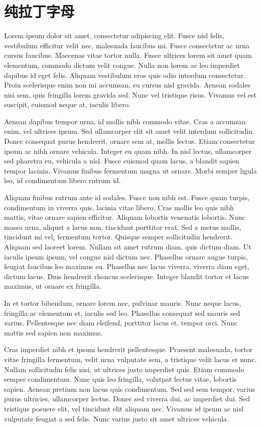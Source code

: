 \documentclass[10pt,openany]{book}
\begin{document}
\storyend

\chapter{纯拉丁字母}

Lorem ipsum dolor sit amet, consectetur adipiscing elit. Fusce nisl felis, vestibulum efficitur velit nec, malesuada faucibus mi. Fusce consectetur ac urna cursus faucibus. Maecenas vitae tortor nulla. Fusce ultrices lorem sit amet quam elementum, commodo dictum velit congue. Nulla non lorem ac leo imperdiet dapibus id eget felis. Aliquam vestibulum eros quis odio interdum consectetur. Proin scelerisque enim non mi accumsan, eu cursus nisl gravida. Aenean sodales nisi sem, quis fringilla lorem gravida sed. Nunc vel tristique risus. Vivamus vel est suscipit, euismod neque at, iaculis libero.

Aenean dapibus tempor urna, id mollis nibh commodo vitae. Cras a accumsan enim, vel ultrices ipsum. Sed ullamcorper elit sit amet velit interdum sollicitudin. Donec consequat purus hendrerit, ornare sem at, mollis lectus. Etiam consectetur ipsum ac nibh ornare vehicula. Integer eu quam nibh. In nisl lectus, ullamcorper sed pharetra eu, vehicula a nisl. Fusce euismod quam lacus,
a blandit sapien tempor lacinia. Vivamus finibus fermentum magna ut ornare. Morbi semper ligula leo, id condimentum libero rutrum id.

Aliquam finibus rutrum ante id sodales. Fusce non nibh est. Fusce quam turpis, condimentum in viverra quis, lacinia vitae libero. Cras mollis leo quis nibh mattis, vitae ornare sapien efficitur. Aliquam lobortis venenatis lobortis. Nunc massa urna, aliquet a lacus non, tincidunt porttitor erat. Sed a metus mollis, tincidunt mi vel, fermentum tortor. Quisque semper sollicitudin hendrerit. Aliquam sed laoreet lorem. Nullam sit amet rutrum diam, quis dictum diam. Ut iaculis ipsum ipsum, vel congue nisl dictum nec. Phasellus ornare augue turpis, feugiat faucibus leo maximus eu. Phasellus nec lacus viverra, viverra diam eget, dictum lacus. Duis hendrerit rhoncus scelerisque. Integer blandit tortor et lacus maximus, ut ornare ex fringilla.

In et tortor bibendum, ornare lorem nec, pulvinar mauris. Nunc neque lacus, fringilla ac elementum et, iaculis sed leo. Phasellus consequat sed mauris sed varius. Pellentesque nec diam eleifend, porttitor lacus et, tempor orci. Nunc mattis sed sapien non maximus.

Cras imperdiet nibh et ipsum hendrerit pellentesque. Praesent malesuada, tortor vitae fringilla fermentum, velit urna vulputate sem, a tristique velit lacus et nunc. Nullam sollicitudin felis nisi, ut ultrices justo imperdiet quis. Etiam commodo semper condimentum. Nunc quis leo fringilla, volutpat lectus vitae, lobortis sapien. Aenean pretium non lacus quis condimentum. Sed sed sem tempor, varius purus ultricies, ullamcorper lectus. Donec sed viverra dui, ac imperdiet dui. Sed tristique posuere elit, vel tincidunt elit aliquam nec. Vivamus id ipsum ac nisl vulputate feugiat a sed felis. Nunc varius justo sit amet ultrices vehicula.
\end{document}
